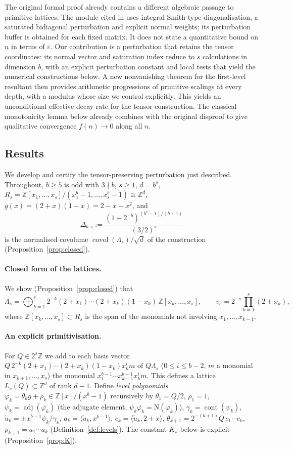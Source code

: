 \documentclass[12pt]{article}
\newcommand{\Z}{\mathbb{Z}}
\newcommand{\covol}{\operatorname{covol}}
\newcommand{\cont}{\operatorname{cont}}
\newcommand{\adj}{\operatorname{adj}}
\newcommand{\Nm}{\mathrm{N}}
\newcommand{\Lat}{\Lambda}
\newcommand{\gpoly}{g}
\begin{document}
The original formal proof already contains a different algebraic passage to primitive lattices. The module cited
in \cite{Ad26} uses integral Smith-type diagonalisation, a saturated bidiagonal perturbation and explicit normal
weights; its perturbation buffer is obtained for each fixed matrix. It does not state a quantitative bound on
$n$ in terms of $\varepsilon$. Our contribution is a perturbation that retains the tensor coordinates: its normal
vector and saturation index reduce to $s$ calculations in dimension $b$, with an explicit perturbation constant and
local tests that yield the numerical constructions below. A new nonvanishing theorem for the first-level resultant
then provides arithmetic progressions of primitive scalings at every depth, with a modulus whose size we control
explicitly. This yields an unconditional effective decay rate for the tensor construction. The classical
monotonicity lemma below already combines with the original disproof to give qualitative convergence
$f(n)\to0$ along all $n$.

\subsection{Results}
We develop and certify the tensor-preserving perturbation just described. Throughout, $b\ge5$ is odd with $3\nmid b$, $s\ge1$, $d=b^s$,
$R_s=\Z[x_1,\dots,x_s]/(x_1^b-1,\dots,x_s^b-1)\cong\Z^d$, $\gpoly(x)=(2+x)(1-x)=2-x-x^2$, and
\begin{equation}\label{eq:Delta}
\Delta_{b,s}:=\frac{(1+2^{-b})^{(b^s-1)/(b-1)}}{(3/2)^s}
\end{equation}
is the normalised covolume $\covol(\Lat_s)/\sqrt d$ of the construction (Proposition~\ref{prop:closed}).

\paragraph{Closed form of the lattices.} We show (Proposition~\ref{prop:closed}) that
\[
\Lat_s=\bigoplus_{k=1}^{s} 2^{-k}(2+x_1)\cdots(2+x_k)(1-x_k)\,\Z[x_k,\dots,x_s],\qquad
v_s=2^{-s}\prod_{k=1}^s(2+x_k),
\]
where $\Z[x_k,\dots,x_s]\subset R_s$ is the span of the monomials not involving $x_1,\dots,x_{k-1}$.

\paragraph{An explicit primitivisation.} For $Q\in2^s\Z$ we add to each basis vector
$Q\,2^{-k}(2+x_1)\cdots(2+x_k)(1-x_k)x_k^im$ of $Q\Lat_s$ ($0\le i\le b-2$, $m$ a monomial in $x_{k+1},\dots,x_s$) the
monomial $x_1^{b-1}\cdots x_{k-1}^{b-1}x_k^im$. This defines a lattice $L_s(Q)\subset\Z^d$ of rank $d-1$.
Define \emph{level polynomials} $\varphi_k=\theta_k\gpoly+\rho_k\in\Z[x]/(x^b-1)$ recursively by $\theta_1=Q/2$, $\rho_1=1$,
$\psi_k=\adj(\overline{\varphi_k})$ (the adjugate element, $\psi_k\overline{\varphi_k}=\Nm(\varphi_k)$),
$\gamma_k=\cont(\psi_k)$, $\tilde u_k=\pm x^{b-1}\psi_k/\gamma_k$, $a_k=\langle\tilde u_k,x^{b-1}\rangle$,
$c_k=\langle\tilde u_k,2+x\rangle$, $\theta_{k+1}=2^{-(k+1)}Q\,c_1\cdots c_k$, $\rho_{k+1}=a_1\cdots a_k$
(Definition~\ref{def:levels}). The constant $K_s$ below is explicit (Proposition~\ref{prop:K}).
\end{document}
